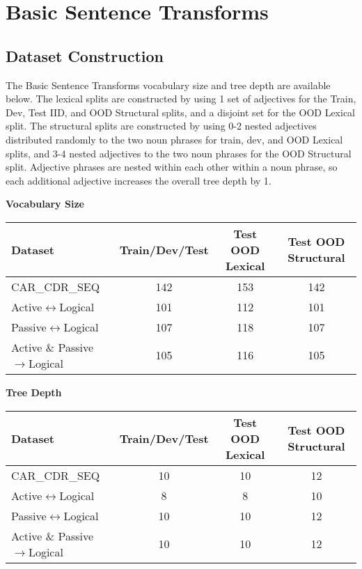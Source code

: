 \vskip 0.15in

\section{Basic Sentence Transforms}

\subsection{Dataset Construction} \label{sec:dataset-construction}
The Basic Sentence Transforms vocabulary size and tree depth are available below. The lexical splits are constructed by using 1 set of adjectives for the Train, Dev, Test IID, and OOD Structural splits, and a disjoint set for the OOD Lexical split. The structural splits are constructed by using 0-2 nested adjectives distributed randomly to the two noun phrases for train, dev, and OOD Lexical splits, and 3-4 nested adjectives to the two noun phrases for the OOD Structural split. Adjective phrases are nested within each other within a noun phrase, so each additional adjective increases the overall tree depth by 1.

\textbf{Vocabulary Size}
\begin{table}[H]
\begin{center}
\begin{sc}
\begin{tabular}{lccc}
\toprule
Dataset & Train/Dev/Test & Test OOD Lexical & Test OOD Structural \\
\midrule
CAR\_CDR\_SEQ & 142 & 153 & 142 \\
Active$\leftrightarrow$Logical & 101 & 112 & 101 \\
Passive$\leftrightarrow$Logical & 107 & 118 & 107 \\
Active \& Passive$\rightarrow$Logical & 105 & 116 & 105 \\
\bottomrule
\end{tabular}
\end{sc}
\end{center}
\vskip -0.1in
\end{table}

\textbf{Tree Depth}
\begin{table}[H]
\begin{center}
\begin{sc}
\begin{tabular}{lccc}
\toprule
Dataset & Train/Dev/Test & Test OOD Lexical & Test OOD Structural \\
\midrule
CAR\_CDR\_SEQ & 10 & 10 & 12 \\
Active$\leftrightarrow$Logical & 8 & 8 & 10 \\
Passive$\leftrightarrow$Logical & 10 & 10 & 12 \\
Active \& Passive$\rightarrow$Logical & 10 & 10 & 12 \\
\bottomrule
\end{tabular}
\end{sc}
\end{center}
\vskip -0.1in
\end{table}


